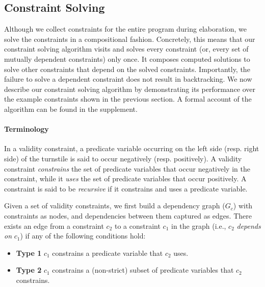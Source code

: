 \subsection{Constraint Solving}
\label{sec:fb-constraintsolving}

Although we collect constraints for the entire program during
elaboration, we solve the constraints in a compositional fashion.
Concretely, this means that our constraint solving algorithm visits
and solves every constraint (or, every set of mutually dependent
constraints) only once. It composes computed solutions to solve other
constraints that depend on the solved constraints. Importantly, the
failure to solve a dependent constraint does not result in
backtracking. We now describe our constraint solving algorithm by
demonstrating its performance over the example constraints shown in
the previous section. A formal account of the algorithm can be found
in the supplement.

\paragraph{Terminology} In a validity constraint, a predicate variable
occurring on the left side (resp. right side) of the turnstile is said
to occur negatively (resp. positively). A validity constraint
\emph{constrains} the set of predicate variables that occur negatively
in the constraint, while it \emph{uses} the set of predicate variables
that occur positively. A constraint is said to be \emph{recursive} if
it constrains and uses a predicate variable.

Given a set of validity constraints, we first build a dependency graph
($G_c$) with constraints as nodes, and dependencies between them
captured as edges. There exists an edge from a constraint $c_2$ to a
constraint $c_1$ in the graph (i.e., $c_2$ \emph{depends on} $c_1$) if
any of the following conditions hold:
\begin{itemize}
\item \textbf{Type 1} $c_1$ constrains a predicate variable that $c_2$ uses. 
\item \textbf{Type 2} $c_1$ constrains a (non-strict) subset of predicate variables
that $c_2$ constrains.
\end{itemize}

